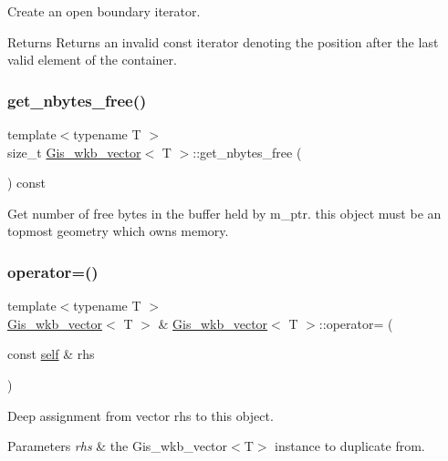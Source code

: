 Create an open boundary iterator. 

\begin{DoxyReturn}{Returns}
Returns an invalid const iterator denoting the position after the last valid element of the container. 
\end{DoxyReturn}
\mbox{\label{classGis__wkb__vector_a71d71fe9cbec2ea04c9b08f9278a490a}} 
\subsubsection{\texorpdfstring{get\+\_\+nbytes\+\_\+free()}{get\_nbytes\_free()}}
{\footnotesize\ttfamily template$<$typename T $>$ \\
size\+\_\+t \mbox{\hyperlink{classGis__wkb__vector}{Gis\+\_\+wkb\+\_\+vector}}$<$ T $>$\+::get\+\_\+nbytes\+\_\+free (\begin{DoxyParamCaption}{ }\end{DoxyParamCaption}) const}

Get number of free bytes in the buffer held by m\+\_\+ptr. this object must be an topmost geometry which owns memory. \mbox{\label{classGis__wkb__vector_a9e183f3cd3142637dd6edfe7682184b7}} 
\subsubsection{\texorpdfstring{operator=()}{operator=()}}
{\footnotesize\ttfamily template$<$typename T $>$ \\
\mbox{\hyperlink{classGis__wkb__vector}{Gis\+\_\+wkb\+\_\+vector}}$<$ T $>$ \& \mbox{\hyperlink{classGis__wkb__vector}{Gis\+\_\+wkb\+\_\+vector}}$<$ T $>$\+::operator= (\begin{DoxyParamCaption}\item[{const \mbox{\hyperlink{classGis__wkb__vector}{self}} \&}]{rhs }\end{DoxyParamCaption})}

Deep assignment from vector \textquotesingle{}rhs\textquotesingle{} to this object. 
\begin{DoxyParams}{Parameters}
{\em rhs} & the Gis\+\_\+wkb\+\_\+vector$<$\+T$>$ instance to duplicate from. \\
\hline
\end{DoxyParams}
\mbox{\label{classGis__wkb__vector_a570dda402fe9aef5438098fe5714086c}} 
